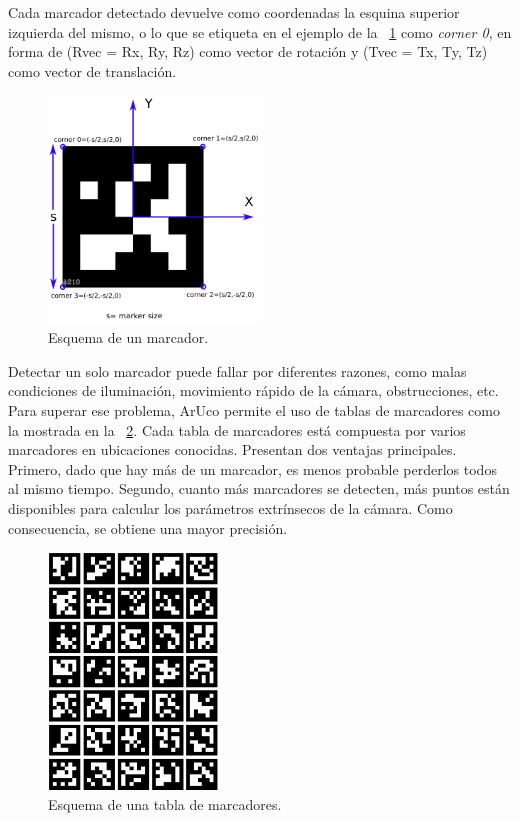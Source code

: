 Cada marcador detectado devuelve como coordenadas la esquina superior izquierda del mismo, o lo que se etiqueta en el ejemplo de la \figurename~\ref{fig:marker_schema} como \emph{corner 0}, en forma de (Rvec = {Rx, Ry, Rz}) como vector de rotación y (Tvec = {Tx, Ty, Tz}) como vector de translación.

\begin{figure}
  \centering
  \includegraphics[width=0.5\textwidth]{imaxes/marker_schema.png}
  \caption{Esquema de un marcador.}
  \label{fig:marker_schema}
\end{figure}

Detectar un solo marcador puede fallar por diferentes razones, como malas condiciones de iluminación, movimiento rápido de la cámara, obstrucciones, etc. Para superar ese problema, ArUco permite el uso de tablas de marcadores como la mostrada en la \figurename~\ref{fig:board_schema}. Cada tabla de marcadores está compuesta por varios marcadores en ubicaciones conocidas. Presentan dos ventajas principales. Primero, dado que hay más de un marcador, es menos probable perderlos todos al mismo tiempo. Segundo, cuanto más marcadores se detecten, más puntos están disponibles para calcular los parámetros extrínsecos de la cámara. Como consecuencia, se obtiene una mayor precisión. 

\begin{figure}
  \centering
  \includegraphics[width=0.4\textwidth, angle=90]{imaxes/board_schema.png}
  \caption{Esquema de una tabla de marcadores.}
  \label{fig:board_schema}
\end{figure}


